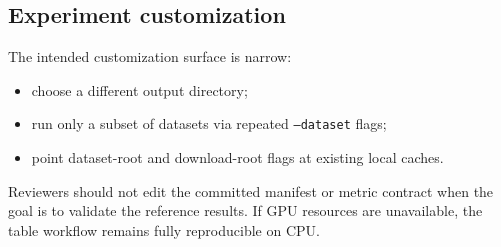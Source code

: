 \documentclass[11pt]{article}
\begin{document}
\subsection{Experiment customization}

The intended customization surface is narrow:
\begin{itemize}
  \item choose a different output directory;
  \item run only a subset of datasets via repeated \texttt{--dataset} flags;
  \item point dataset-root and download-root flags at existing local caches.
\end{itemize}
Reviewers should not edit the committed manifest or metric contract when the
goal is to validate the reference results. If GPU resources are unavailable,
the table workflow remains fully reproducible on CPU.

\end{document}
